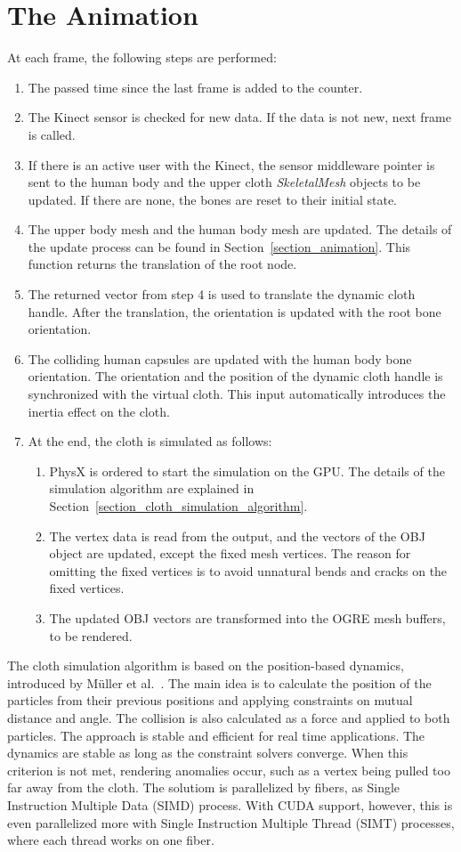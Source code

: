 \section{The Animation}
At each frame, the following steps are performed:
\begin{enumerate}
\item The passed time since the last frame is added to the counter.
\item The Kinect sensor is checked for new data. If the data is not new, next frame is called. 
\item If there is an active user with the Kinect, the sensor middleware pointer is sent to the human body and the upper cloth {\em SkeletalMesh} objects to be updated. If there are none, the bones are reset to their initial state.
\item The upper body mesh and the human body mesh are updated. The details of the update process can be found in Section~\ref{section_animation}. This function returns the translation of the root node. 
\item The returned vector from step 4 is used to translate the dynamic cloth handle. After the translation, the orientation is  updated with the root bone orientation.
\item The colliding human capsules are updated with the human body bone orientation. The orientation and the position of the dynamic cloth handle is synchronized with the virtual cloth. This input automatically introduces the inertia effect on the cloth.
\item At the end, the cloth is simulated as follows:
\begin{enumerate}
\item PhysX is ordered to start the simulation on the GPU. The details of the simulation algorithm are explained in Section~\ref{section_cloth_simulation_algorithm}.
\item The vertex data is read from the output, and the vectors of the OBJ object are updated, except the fixed mesh vertices. The reason for omitting the fixed vertices is to avoid unnatural bends and cracks on the fixed vertices.
  \item The updated OBJ vectors are transformed into the OGRE mesh buffers, to be rendered. 
\end{enumerate}
\end{enumerate}

The cloth simulation algorithm is based on the position-based dynamics, introduced by M{\"u}ller et al.~\cite{Muller2007}. The main idea is to calculate the position of the particles from their previous positions and applying constraints on mutual distance and angle. The collision is also calculated as a force and applied to both particles. The approach is stable and efficient for real time applications.
The dynamics are stable as long as the constraint solvers converge. When this criterion is not met, rendering anomalies occur, such as a vertex being pulled too far away from the cloth. The solutiom is parallelized by fibers, as Single Instruction Multiple Data (SIMD) process. With CUDA support, however, this is even parallelized more with Single Instruction Multiple Thread (SIMT) processes, where each thread works on one fiber.

